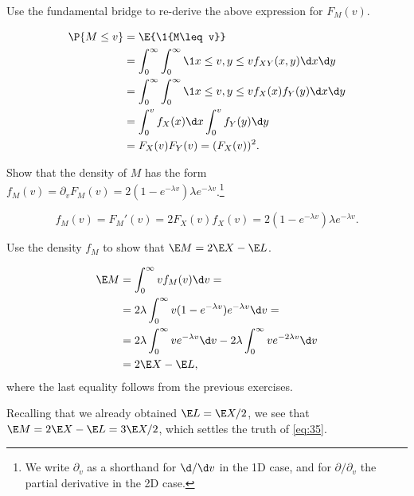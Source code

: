 \documentclass[a4paper]{article}
\begin{document}
\begin{exercise}
Use the fundamental bridge to re-derive the above expression for \(F_M(v)\).
\begin{solution}
\begin{align*}
\P{M\leq v}
&= \E{\1{M\leq v}} \\
&=\int_0^{\infty} \int_0^{\infty} \1{x\leq v, y\leq v} f_{XY}(x,y) \d x \d y \\
&= \int_0^{\infty} \int_0^{\infty} \1{x\leq v, y\leq v} f_{X}(x) f_{Y}(y) \d x \d y \\
&= \int_0^{v} f_{X}(x) \d x \int_0^{v}  f_{Y}(y)  \d y \\
&= F_{X}(v) F_Y(v) = (F_X(v))^2.
\end{align*}
\end{solution}
\end{exercise}


\begin{exercise}
Show that the density of \(M\) has the form \(f_{M}(v)=\partial_{v} F_M(v) = 2(1-e^{-\lambda v}) \lambda e^{-\lambda v}\).\footnote{We write \(\partial_{v}\) as a shorthand for \(\d/\d v\) in the 1D case, and for \(\partial/\partial_{v}\) the partial derivative in the 2D case.}
\begin{solution}
\begin{equation*}
  f_M(v) = F_M'(v) = 2 F_X(v) f_X(v) = 2(1-e^{-\lambda v}) \lambda e^{- \lambda v}.
\end{equation*}
\end{solution}
\label{ex:6}
\end{exercise}

\begin{exercise}
Use  the density \(f_{M}\) to show  that \(\E M = 2\E X - \E L\).
\begin{solution}
\begin{align*}
\E M
&= \int_{0}^{\infty} v f_M(v) \d v = \\
&= 2 \lambda \int_{0}^{\infty} v (1-e^{-\lambda v}) e^{-\lambda v} \d v = \\
&= 2 \lambda \int_{0}^{\infty} v e^{-\lambda v} \d v -  2 \lambda \int_{0}^{\infty} v e^{-2 \lambda v} \d v \\
&= 2 \E X - \E L,
\end{align*}
where the last equality follows from the previous exercises.
\end{solution}
\end{exercise}

Recalling that we already obtained  \(\E L = \E X/ 2\),  we see that \(\E M = 2 \E X - \E L = 3\E X/2\), which settles the truth of  \cref{eq:35}.
\end{document}
